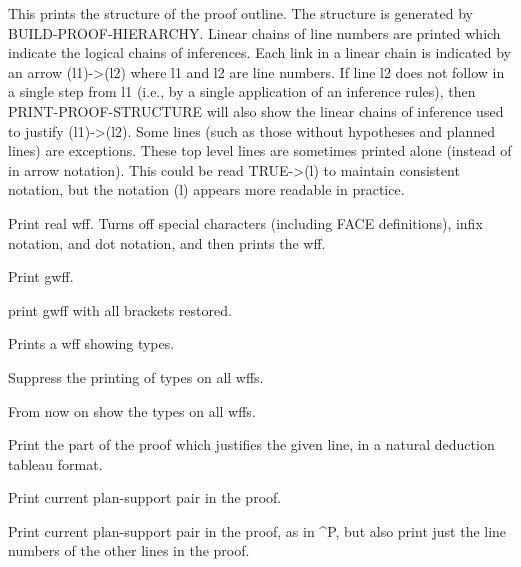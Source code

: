 \begin{description}
\item[\parbox{\textwidth}{PRINT-PROOF-STRUCTURE}]  
This prints the structure of the proof outline.  The
structure is generated by BUILD-PROOF-HIERARCHY.  Linear chains
of line numbers are printed which indicate the logical chains of
inferences.  Each link in a linear chain is indicated by an
arrow (l1)->(l2) where l1 and l2 are line numbers.  If line l2
does not follow in a single step from l1 (i.e., by a single application 
of an inference rules), then PRINT-PROOF-STRUCTURE will also show the
linear chains of inference used to justify (l1)->(l2).  Some lines
(such as those without hypotheses and planned lines) are
exceptions.  These top level lines are sometimes printed alone 
(instead of in arrow notation).  This could be read TRUE->(l) 
to maintain consistent notation, but the notation (l) appears 
more readable in practice.

\item[\parbox{\textwidth}{PRW \textit{gwff}}]  
Print real wff. Turns off special characters
(including FACE definitions), infix notation, and dot 
notation, and then prints the wff.

\item[\parbox{\textwidth}{PW \textit{gwff}}]  
Print gwff.

\item[\parbox{\textwidth}{PWSCOPE \textit{gwff}}]  
print gwff with all brackets restored.

\item[\parbox{\textwidth}{PWTYPES \textit{gwff}}]  
Prints a wff showing types.

\item[\parbox{\textwidth}{SHOWNOTYPES}]  
Suppress the printing of types on all wffs.

\item[\parbox{\textwidth}{SHOWTYPES}]  
From now on show the types on all wffs.

\item[\parbox{\textwidth}{TABLEAU \textit{line}}]  
Print the part of the proof which justifies the given line,
in a natural deduction tableau format.

\item[\parbox{\textwidth}{\textasciicircum P}]  
Print current plan-support pair in the proof.

\item[\parbox{\textwidth}{\textasciicircum PN}]  
Print current plan-support pair in the proof, as in \textasciicircum P, but 
also print just the line numbers of the other lines in the proof.
\item
\end{description}

